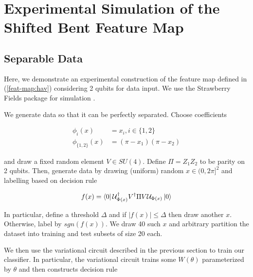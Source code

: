 \documentclass[main.tex]{subfiles}
\begin{document}
%
%
%
\section{Experimental Simulation of the Shifted Bent Feature Map}

\subsection{Separable Data}

Here, we demonstrate an experimental construction of the feature map defined in (\ref{feat-map:hav}) considering 2 qubits for data input. We use the Strawberry Fields package for simulation \cite{killoran2019strawberry}.

We generate data so that it can be perfectly separated. Choose coefficients

\begin{align*}
\phi_{i}(x) &= x_i, i \in \{1, 2\} \\
\phi_{\{1,2\}}(x) &= (\pi - x_1)(\pi - x_2) 
\end{align*}

and draw a fixed random element $V \in SU(4)$. Define $\Pi = Z_1Z_2$ to be parity on 2 qubits. Then, generate data by drawing (uniform) random $x \in (0, 2\pi]^2$ and labelling based on decision rule

\begin{align*}
f(x) = \bra{0} \mathcal{U}_{\Phi(x)}^\dag V^\dag \Pi V \mathcal{U}_{\Phi(x)}\ket{0}	 
\end{align*}

In particular, define a threshold $\Delta$ and if $|f(x)| \leq \Delta$ then draw another $x$. Otherwise, label by $sgn(f(x))$. We draw 40 such $x$ and arbitrary partition the dataset into training and test subsets of size 20 each.
 
We then use the variational circuit described in the previous section to train our classifier. In particular, the variational circuit trains some $W(\theta)$ parameterized by $\theta$ and then constructs decision rule
\end{document}
